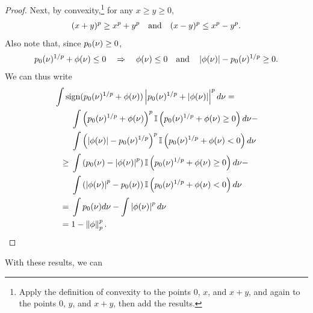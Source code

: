 \begin{lem}
\begin{proof}
Next, by convexity,\footnote{Apply the definition of convexity to the points
$0$, $x$, and $x + y$, and again to the points $0$, $y$, and $x+y$, then add the
results.} for any $x \ge y \ge 0$,
%
\begin{align*}
%
(x + y)^p \ge{} x^p + y^p \mathand
(x - y)^p \le{} x^p - y^p.
%
\end{align*}
%
Also note that, since $p_{0}(\nu) \ge 0$,
%
\begin{align*}
%
\pbase(\nu)^{1/p} + \phi(\nu) \le 0
\quad\Rightarrow\quad
\phi(\nu) \le 0 \mathand
\abs{\phi(\nu)} - \pbase(\nu)^{1/p} \ge 0.
%
\end{align*}
%
We can thus write
%
\begin{align*}
%
\MoveEqLeft
\int \mathrm{sign}(\pbase(\nu)^{1/p} + \phi(\nu))
    \abs{\pbase(\nu)^{1/p} + \abs{\phi(\nu)}}^{p} d\nu
={}\\&
    \int \left(\pbase(\nu)^{1/p} + \phi(\nu)\right)^{p}
        \ind{\pbase(\nu)^{1/p} + \phi(\nu) \ge 0}
        d\nu - \\&
    \int \left(\abs{\phi(\nu)} - \pbase(\nu)^{1/p}\right)^{p}
        \ind{\pbase(\nu)^{1/p} + \phi(\nu) < 0}
        d\nu
\\\ge{}&
    \int \left(\pbase(\nu) - \abs{\phi(\nu)}^{p}\right)
        \ind{\pbase(\nu)^{1/p} + \phi(\nu) \ge 0}
        d\nu - \\&
    \int \left(\abs{\phi(\nu)}^p - \pbase(\nu)\right)
        \ind{\pbase(\nu)^{1/p} + \phi(\nu) < 0}
        d\nu
\\={}&
    \int \pbase(\nu) d\nu - \int \abs{\phi(\nu)}^p d\nu
\\={}&
    1 - \norm{\phi}_p^p.
%
\end{align*}
%
\end{proof}
%
\end{lem}



With these results, we can 
